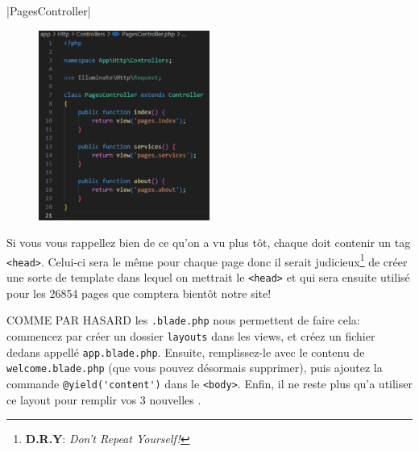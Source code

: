 \newpage 
{}|PagesController|
\begin{figure}
    \centering
    \includegraphics[width=0.5\textwidth]{figures-C1/pages_controller_1.pdf}
    \caption{\protect{}\label{fig:PagesController1}}
\end{figure}
Si vous vous rappellez bien de ce qu'on a vu plus tôt, chaque \view{} \html{} doit contenir un tag \verb|<head>|. Celui-ci sera le même pour chaque page donc il serait judicieux\footnote{\textbf{D.R.Y}: \textit{Don't Repeat Yourself!}} de créer une sorte de template dans lequel on mettrait le \verb|<head>| et qui sera ensuite utilisé pour les 26854 pages que comptera bientôt notre site! 

COMME PAR HASARD les \views{} \verb|.blade.php| nous permettent de faire cela: commencez par créer un dossier \verb|layouts| dans les views, et créez un fichier dedans appellé \verb|app.blade.php|. Ensuite, remplissez-le avec le contenu de \verb|welcome.blade.php| (que vous pouvez désormais supprimer), puis ajoutez la commande \verb|@yield('content')| dans le \verb|<body>|. Enfin, il ne reste plus qu'a utiliser ce layout pour remplir vos 3 nouvelles \views{}.

